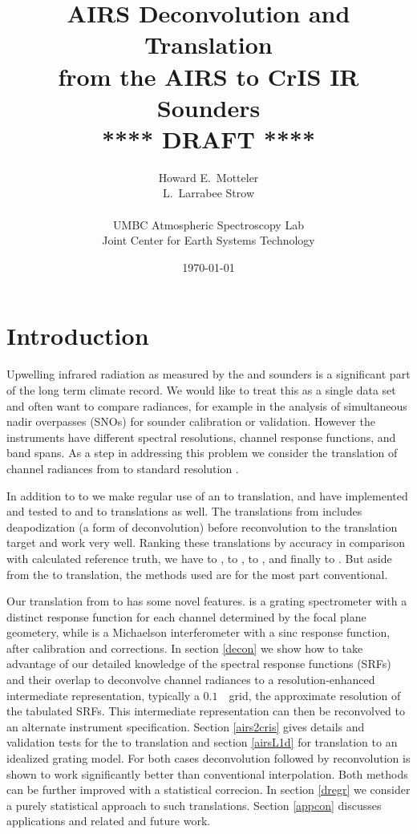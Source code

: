 \documentclass[11pt]{article}
\title{AIRS Deconvolution and Translation \\
  from the AIRS to CrIS IR Sounders \\
  \vspace{3mm}
  {****} DRAFT {****}\\
}
\author{Howard E.~Motteler \\
  L.~Larrabee Strow \\
  \\
  UMBC Atmospheric Spectroscopy Lab \\
  Joint Center for Earth Systems Technology \\
}
\date{\today}
\begin{document}
\maketitle

\section{Introduction}

Upwelling infrared radiation as measured by the {\airs} \cite{airs1}
and {\cris} \cite{cris1,cris2} sounders is a significant part of the
long term climate record.  We would like to treat this as a single
data set and often want to compare radiances, for example in the
analysis of simultaneous nadir overpasses (SNOs) for sounder
calibration or validation.  However the instruments have different
spectral resolutions, channel response functions, and band spans.
As a step in addressing this problem we consider the translation of
channel radiances from {\airs} to standard resolution {\cris}.

In addition to {\airs} to {\cris} we make regular use of an {\iasi}
to {\cris} translation, and have implemented and tested {\iasi} to
{\airs} and {\cris} to {\airs} translations as well.  The
translations from {\iasi} includes deapodization (a form of
deconvolution) before reconvolution to the translation target and
work very well.  Ranking these translations by accuracy in
comparison with calculated reference truth, we have {\iasi} to
{\cris}, {\iasi} to {\airs}, {\airs} to {\cris}, and finally {\cris}
to {\airs} \cite{git:decon}.  But aside from the {\airs} to {\cris}
translation, the methods used are for the most part conventional.

Our translation from {\airs} to {\cris} has some novel features.
{\airs} is a grating spectrometer with a distinct response function
for each channel determined by the focal plane geometery, while
{\cris} is a Michaelson interferometer with a sinc response
function, after calibration and corrections.  In section \ref{decon}
we show how to take advantage of our detailed knowledge of the
{\airs} spectral response functions (SRFs) and their overlap to
deconvolve channel radiances to a resolution-enhanced intermediate
representation, typically a $0.1$~\wn\ grid, the approximate
resolution of the tabulated {\airs} SRFs.  
This intermediate representation can then be reconvolved to an
alternate instrument specification.  Section \ref{airs2cris} gives
details and validation tests for the {\airs} to {\cris} translation
and section \ref{airsL1d} for translation to an idealized grating
model.  For both cases deconvolution followed by reconvolution is
shown to work significantly better than conventional interpolation.
Both methods can be further improved with a statistical correcion.
In section \ref{dregr} we consider a purely statistical approach to
such translations.  Section \ref{appcon} discusses applications and
related and future work.
\end{document}
